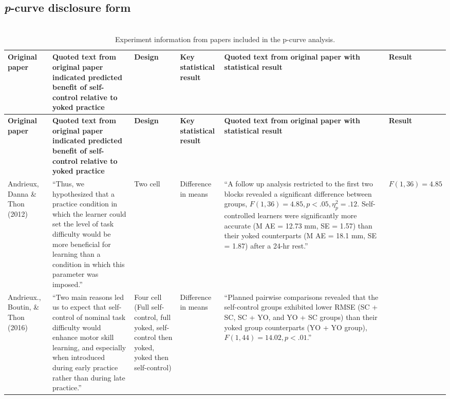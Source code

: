 \documentclass[man,floatsintext,hidelinks]{apa7}
\begin{document}
\appendix
\begin{landscape}
\section{\emph{p}-curve disclosure form}
\footnotesize
\begin{longtable}[l]{p{2cm}p{5.5cm}p{3cm}p{2cm}p{6cm}p{1.5cm}}
	\caption{\\ Experiment information from papers included in the p-curve analysis.}
	\label{tab:TableA1}\\
\hline
  \textbf{Original paper} &
  \textbf{Quoted text from original paper indicated predicted benefit of self-control relative to yoked practice} &
  \textbf{Design} &
  \textbf{Key statistical  result} &
  \textbf{Quoted text from original paper with statistical result} &
  \textbf{Result}
  \\
\hline
\endfirsthead
%
\hline
  \textbf{Original paper} &
  \textbf{Quoted text from original paper indicated predicted benefit of self-control relative to yoked practice} &
  \textbf{Design} &
  \textbf{Key statistical  result} &
  \textbf{Quoted text from original paper with statistical result} &
  \textbf{Result}
  \\
\hline
\endhead
%
Andrieux, Danna \& Thon (2012) &
  ``Thus, we hypothesized that a practice condition in which the learner could set the level of task difficulty would be more beneficial for learning than a condition in which this parameter was imposed.'' &
  Two cell &
  Difference in means &
  ``A follow up analysis restricted to the first two blocks revealed a significant difference between groups, $F(1, 36) = 4.85, p < .05, \eta_{p}^2 = .12$. Self-controlled learners were significantly more accurate (M AE = 12.73 mm, SE = 1.57) than their yoked counterparts (M AE = 18.1 mm, SE = 1.87) after a 24-hr rest.'' &
  $F(1, 36) = 4.85$
   \\[3.75cm]
Andrieux., Boutin, \& Thon (2016) &
  ``Two main reasons led us to expect that self-control of nominal task difficulty would enhance motor skill learning, and especially when introduced during early practice rather than during late practice.'' &
  Four cell (Full self-control, full yoked, self-control then yoked, yoked then self-control) &
  Difference in means &
  ``Planned pairwise comparisons revealed that the self-control groups exhibited lower RMSE (SC + SC, SC + YO, and YO + SC groups) than their yoked group counterparts (YO + YO group), $F(1, 44) = 14.02, p < .01$.'' &

\end{longtable}
\end{landscape}
\end{document}
